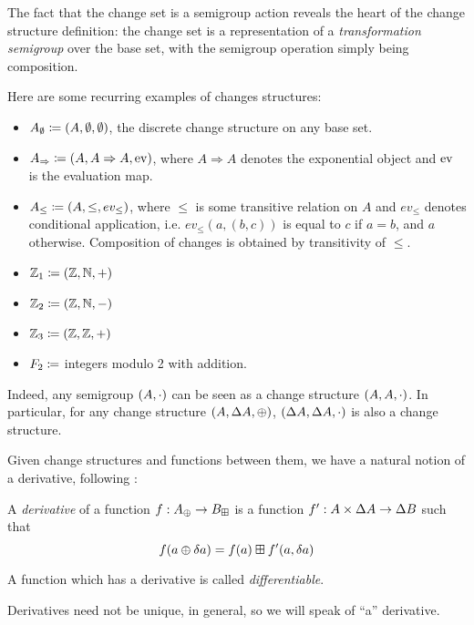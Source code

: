 The fact that the change set is a semigroup action reveals the heart of the
change structure definition: the change set is a representation of a
\textit{transformation semigroup} over the base set, with the semigroup
operation simply being composition.

Here are some recurring examples of changes structures:
\begin{itemize}
  \item $A_\emptyset \coloneqq (A,\emptyset,\emptyset)$, the discrete change structure on any base set.
  \item $A_\Rightarrow \coloneqq (A,A\Rightarrow A,\operatorname{ev})$, where $A
    \Rightarrow A$ denotes the exponential object and $\operatorname{ev}$ is the evaluation map.
  \item $A_\leq \coloneqq (A,\leq,ev_\leq)$, where $\leq$ is some
    transitive relation on $A$ and $ev_\leq$ denotes
    conditional application, i.e. $ev_\leq(a, (b, c))$ is equal to $c$ if $a = b$, and $a$ otherwise. Composition of changes is obtained
    by transitivity of $\leq$.
  \item $\mathbb{Z}_1 \coloneqq (\mathbb{Z},\mathbb{N},+)$
  \item $\mathbb{Z}_2 \coloneqq (\mathbb{Z},\mathbb{N},-)$
  \item $\mathbb{Z}_3 \coloneqq (\mathbb{Z},\mathbb{Z},+)$
  \item $F_2 \coloneqq$ integers modulo 2 with addition.
\end{itemize}
Indeed, any semigroup $(A, \cdot)$ can be seen as a change structure $(A,A,\cdot)$. In particular,
for any change structure $(A,\Delta A,\oplus)$,
$(\Delta A,\Delta A,\cdot)$ is also a change structure.

Given change structures and functions between them, we have a natural notion of a derivative, following \cite{cai2014changes}:

\begin{defn}[Derivatives]
  A \textit{derivative} of a function $f: A_\oplus \rightarrow B_\boxplus$ is a function $f': A \times \Delta A \rightarrow
  \Delta B$ such that
  $$f(a \oplus \delta a) = f(a) \boxplus f'(a, \delta a)$$

  A function which has a derivative is called \textit{differentiable}.
\end{defn}

Derivatives need not be unique, in general, so we will speak of ``a''
derivative. 

